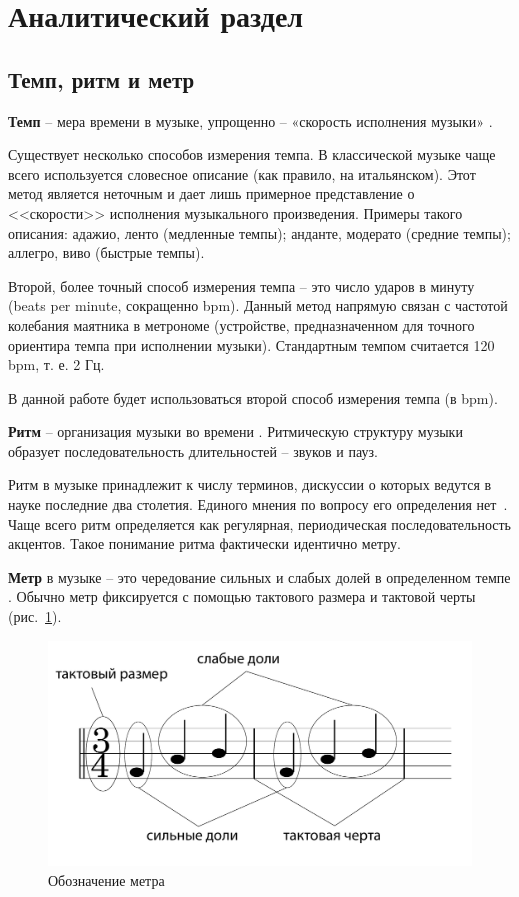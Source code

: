 \section{Аналитический раздел}

\subsection{Темп, ритм и метр}

\textbf{Темп} -- мера времени в музыке, упрощенно -- «скорость исполнения музыки» \cite{grouv}.

Существует несколько способов измерения темпа. В классической музыке чаще всего используется словесное описание (как правило, на итальянском). Этот метод является неточным и дает лишь примерное представление о <<скорости>> исполнения музыкального произведения. Примеры такого описания: адажио, ленто (медленные темпы); анданте, модерато (средние темпы); аллегро, виво (быстрые темпы).

Второй, более точный способ измерения темпа -- это число ударов в минуту (beats per minute, сокращенно bpm). Данный метод напрямую связан с частотой колебания маятника в метрономе (устройстве, предназначенном для точного ориентира темпа при исполнении музыки). Стандартным темпом считается 120 bpm, т. е. 2 Гц.

В данной работе будет использоваться второй способ измерения темпа (в bpm).

\textbf{Ритм} -- организация музыки во времени \cite{chehovich}. Ритмическую структуру музыки образует последовательность длительностей -- звуков и пауз.

Ритм в музыке принадлежит к числу терминов, дискуссии о которых ведутся в науке последние два столетия. Единого мнения по вопросу его определения нет~\cite{rhythm}. Чаще всего ритм определяется как регулярная, периодическая последовательность акцентов. Такое понимание ритма фактически идентично метру.

\textbf{Метр} в музыке -- это чередование сильных и слабых долей в определенном темпе \cite{grouv}. Обычно метр фиксируется с помощью тактового размера и тактовой черты (рис.~\ref{img:meter}).

\begin{figure}[h]
	\centering
	\includegraphics[scale=0.4]{svg/barlines.pdf}
	\caption{Обозначение метра}
	\label{img:meter}
\end{figure}


